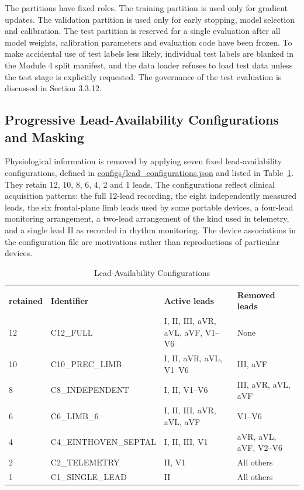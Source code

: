 The partitions have fixed roles. The training partition is used only for gradient updates. The validation partition is used only for early stopping, model selection and calibration. The test partition is reserved for a single evaluation after all model weights, calibration parameters and evaluation code have been frozen. To make accidental use of test labels less likely, individual test labels are blanked in the Module 4 split manifest, and the data loader refuses to load test data unless the test stage is explicitly requested. The governance of the test evaluation is discussed in Section 3.3.12.

\subsection{Progressive Lead-Availability Configurations and Masking}
Physiological information is removed by applying seven fixed lead-availability configurations, defined in \url{configs/lead_configurations.json} and listed in Table~\ref{tab:lead_configurations}. They retain 12, 10, 8, 6, 4, 2 and 1 leads. The configurations reflect clinical acquisition patterns: the full 12-lead recording, the eight independently measured leads, the six frontal-plane limb leads used by some portable devices, a four-lead monitoring arrangement, a two-lead arrangement of the kind used in telemetry, and a single lead II as recorded in rhythm monitoring. The device associations in the configuration file are motivations rather than reproductions of particular devices.

\begin{table}[htbp]
\centering
\small
\caption{Lead-Availability Configurations}
\label{tab:lead_configurations}
\renewcommand{\arraystretch}{1.2}
\setlength{\tabcolsep}{3pt}
\begin{tabular}{|p{1.6cm}|p{3.8cm}|p{4.3cm}|p{4.3cm}|}
\hline
\shortstack{\textbf{Leads}\\\textbf{retained}} & \textbf{Identifier} & \textbf{Active leads} & \textbf{Removed leads} \\ \hline
12 & C12\_FULL & I, II, III, aVR, aVL, aVF, V1--V6 & None \\ \hline
10 & C10\_PREC\_LIMB & I, II, aVR, aVL, V1--V6 & III, aVF \\ \hline
8 & C8\_INDEPENDENT & I, II, V1--V6 & III, aVR, aVL, aVF \\ \hline
6 & C6\_LIMB\_6 & I, II, III, aVR, aVL, aVF & V1--V6 \\ \hline
4 & C4\_EINTHOVEN\_\allowbreak SEPTAL & I, II, III, V1 & aVR, aVL, aVF, V2--V6 \\ \hline
2 & C2\_TELEMETRY & II, V1 & All others \\ \hline
1 & C1\_SINGLE\_LEAD & II & All others \\ \hline
\end{tabular}
\end{table}

